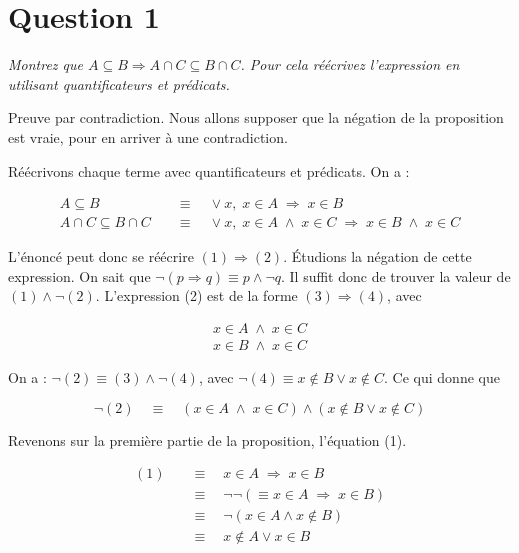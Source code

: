 \section*{Question 1}
\emph{Montrez que \( A \subseteq B \Rightarrow A \cap C \subseteq B \cap C\). Pour cela réécrivez l’expression en utilisant quantificateurs et prédicats.}

\bigskip
Preuve par contradiction. Nous allons supposer que la négation de la proposition est vraie, pour en arriver à une contradiction.

Réécrivons chaque terme avec quantificateurs et prédicats. On a :

\begin{align}
	A \subseteq B \quad               & \equiv \quad \vee x, \; x \in A \; \Rightarrow \; x \in B                                           \\
	A \cap C \subseteq B \cap C \quad & \equiv \quad \vee x, \; x \in A \; \wedge \; x \in C \; \Rightarrow \; x \in B \; \wedge \; x \in C
\end{align}

L’énoncé peut donc se réécrire \( (1) \Rightarrow (2) \). Étudions la négation de cette expression. On sait que \( \neg (p \Rightarrow q) \equiv p \wedge \neg q\). Il suffit donc de trouver la valeur de \( (1) \wedge \neg (2)\). L’expression (2) est de la forme \((3) \Rightarrow (4)\), avec

\begin{align}
	x \in A \; \wedge \; x \in C \\
	x \in B \; \wedge \; x \in C
\end{align}

On a : \( \neg (2) \equiv (3) \wedge \neg (4)\), avec \(\neg (4) \equiv x \notin B \vee x \notin C\). Ce qui donne que 

\[ \neg (2) \quad \equiv \quad (x \in A \; \wedge \; x \in C) \wedge (x \notin B \vee x \notin C) \]

Revenons sur la première partie de la proposition, l’équation (1).

\begin{align*}
	(1)   \quad & \equiv \quad x \in A \; \Rightarrow \; x \in B                    \\
	            & \equiv \quad \neg \neg (\equiv x \in A \; \Rightarrow \; x \in B) \\
	            & \equiv \quad \neg (x \in A \wedge x \notin B )                    \\
	            & \equiv \quad  x \notin A \vee x \in B
\end{align*}

